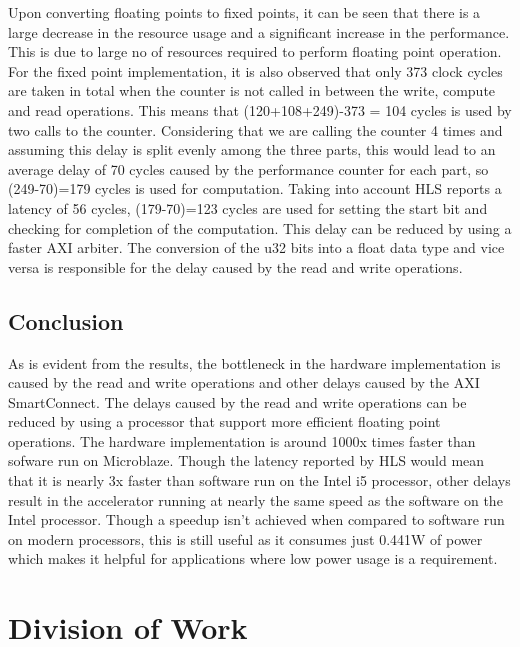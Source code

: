 \documentclass[11pt, a4paper]{article}
\begin{document}
\FloatBarrier
Upon converting floating points to fixed points, it can be seen that there is a large decrease in the resource usage and a significant increase in the performance. This is due to large no of resources required to perform floating point operation. For the fixed point implementation, it is also observed that only 373 clock cycles are taken in total when the counter is not called in between the write, compute and read operations. This means that (120+108+249)-373 = 104 cycles is used by two calls to the counter. Considering that we are calling the counter 4 times and assuming this delay is split evenly among the three parts, this would lead to an average delay of 70 cycles caused by the performance counter for each part, so (249-70)=179 cycles is used for computation. Taking into account HLS reports a latency of 56 cycles, (179-70)=123 cycles are used for setting the start bit and checking for completion of the computation. This delay can be reduced by using a faster AXI arbiter. The conversion of the u32 bits into a float data type and vice versa is responsible for the delay caused by the read and write operations.

\subsection{Conclusion}
As is evident from the results, the bottleneck in the hardware implementation is caused by the read and write operations and other delays caused by the AXI SmartConnect. The delays caused by the read and write operations can be reduced by using a processor that support more efficient floating point operations. The hardware implementation is around 1000x times faster than sofware run on Microblaze. Though the latency reported by HLS would mean that it is nearly 3x faster than software run on the Intel i5 processor, other delays result in the accelerator running at nearly the same speed as the software on the Intel processor. Though a speedup isn't achieved when compared to software run on modern processors, this is still useful as it consumes just 0.441W of power which makes it helpful for applications where low power usage is a requirement.


\section{Division of Work}
\end{document}

